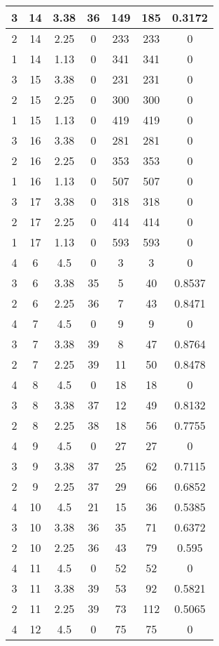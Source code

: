 \documentclass[letterpaper, 12pt]{article}
\begin{document}
\begin{longtable}{|c|c|c|c|c|c|c|}
\hline
3 & 14 & 3.38 & 36 & 149 & 185 & 0.3172 \\
\hline
2 & 14 & 2.25 & 0 & 233 & 233 & 0 \\
\hline
1 & 14 & 1.13 & 0 & 341 & 341 & 0 \\
\hline
3 & 15 & 3.38 & 0 & 231 & 231 & 0 \\
\hline
2 & 15 & 2.25 & 0 & 300 & 300 & 0 \\
\hline
1 & 15 & 1.13 & 0 & 419 & 419 & 0 \\
\hline
3 & 16 & 3.38 & 0 & 281 & 281 & 0 \\
\hline
2 & 16 & 2.25 & 0 & 353 & 353 & 0 \\
\hline
1 & 16 & 1.13 & 0 & 507 & 507 & 0 \\
\hline
3 & 17 & 3.38 & 0 & 318 & 318 & 0 \\
\hline
2 & 17 & 2.25 & 0 & 414 & 414 & 0 \\
\hline
1 & 17 & 1.13 & 0 & 593 & 593 & 0 \\
\hline
4 & 6 & 4.5 & 0 & 3 & 3 & 0 \\
\hline
3 & 6 & 3.38 & 35 & 5 & 40 & 0.8537 \\
\hline
2 & 6 & 2.25 & 36 & 7 & 43 & 0.8471 \\
\hline
4 & 7 & 4.5 & 0 & 9 & 9 & 0 \\
\hline
3 & 7 & 3.38 & 39 & 8 & 47 & 0.8764 \\
\hline
2 & 7 & 2.25 & 39 & 11 & 50 & 0.8478 \\
\hline
4 & 8 & 4.5 & 0 & 18 & 18 & 0 \\
\hline
3 & 8 & 3.38 & 37 & 12 & 49 & 0.8132 \\
\hline
2 & 8 & 2.25 & 38 & 18 & 56 & 0.7755 \\
\hline
4 & 9 & 4.5 & 0 & 27 & 27 & 0 \\
\hline
3 & 9 & 3.38 & 37 & 25 & 62 & 0.7115 \\
\hline
2 & 9 & 2.25 & 37 & 29 & 66 & 0.6852 \\
\hline
4 & 10 & 4.5 & 21 & 15 & 36 & 0.5385 \\
\hline
3 & 10 & 3.38 & 36 & 35 & 71 & 0.6372 \\
\hline
2 & 10 & 2.25 & 36 & 43 & 79 & 0.595 \\
\hline
4 & 11 & 4.5 & 0 & 52 & 52 & 0 \\
\hline
3 & 11 & 3.38 & 39 & 53 & 92 & 0.5821 \\
\hline
2 & 11 & 2.25 & 39 & 73 & 112 & 0.5065 \\
\hline
4 & 12 & 4.5 & 0 & 75 & 75 & 0 \\

\end{longtable}
\end{document}
